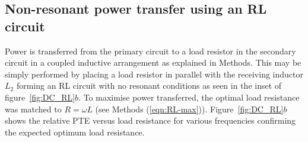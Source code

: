 \documentclass[11pt]{iopart}
\begin{document}
\subsection*{Non-resonant power transfer using an RL circuit}
Power is transferred from the primary circuit to a load resistor in
the secondary circuit in a coupled inductive arrangement as explained
in Methods. This may be simply performed by placing a load resistor in
parallel with the receiving inductor $L_2$ forming an RL circuit with
no resonant conditions as seen in the inset of figure~\ref{fig:DC_RL}$b$. To maximise
power transferred, the optimal load resistance was matched to $R =
\omega L$ (see Methods (\ref{eqn:RL-max})). Figure~\ref{fig:DC_RL}$b$
shows the relative PTE versus load resistance for various frequencies
confirming the expected optimum load resistance.
\end{document}
